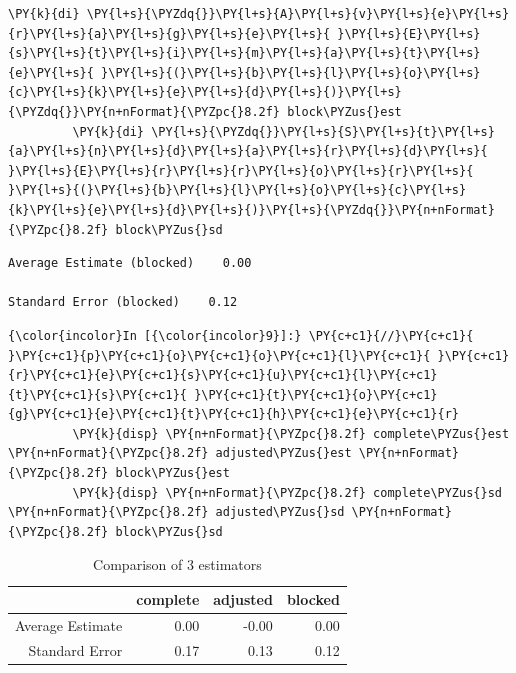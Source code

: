\documentclass[11pt,notitlepage]{article}\usepackage[]{graphicx}\usepackage[]{color}
\makeatletter
\newenvironment{kframe}{%
 \def\at@end@of@kframe{}%
 \ifinner\ifhmode%
  \def\at@end@of@kframe{\end{minipage}}%
  \begin{minipage}{\columnwidth}%
 \fi\fi%
 \def\FrameCommand##1{\hskip\@totalleftmargin \hskip-\fboxsep
 \colorbox{shadecolor}{##1}\hskip-\fboxsep
     \hskip-\linewidth \hskip-\@totalleftmargin \hskip\columnwidth}%
 \MakeFramed {\advance\hsize-\width
   \@totalleftmargin\z@ \linewidth\hsize
   \@setminipage}}%
 {\par\unskip\endMakeFramed%
 \at@end@of@kframe}
\newenvironment{knitrout}{}{} %
\makeatother
\begin{document}
\begin{enumerate}[a)]
\begin{knitrout}
\begin{kframe}
\begin{Verbatim}[commandchars=\\\{\}]
         \PY{k}{di} \PY{l+s}{\PYZdq{}}\PY{l+s}{A}\PY{l+s}{v}\PY{l+s}{e}\PY{l+s}{r}\PY{l+s}{a}\PY{l+s}{g}\PY{l+s}{e}\PY{l+s}{ }\PY{l+s}{E}\PY{l+s}{s}\PY{l+s}{t}\PY{l+s}{i}\PY{l+s}{m}\PY{l+s}{a}\PY{l+s}{t}\PY{l+s}{e}\PY{l+s}{ }\PY{l+s}{(}\PY{l+s}{b}\PY{l+s}{l}\PY{l+s}{o}\PY{l+s}{c}\PY{l+s}{k}\PY{l+s}{e}\PY{l+s}{d}\PY{l+s}{)}\PY{l+s}{\PYZdq{}}\PY{n+nFormat}{\PYZpc{}8.2f} block\PYZus{}est
         \PY{k}{di} \PY{l+s}{\PYZdq{}}\PY{l+s}{S}\PY{l+s}{t}\PY{l+s}{a}\PY{l+s}{n}\PY{l+s}{d}\PY{l+s}{a}\PY{l+s}{r}\PY{l+s}{d}\PY{l+s}{ }\PY{l+s}{E}\PY{l+s}{r}\PY{l+s}{r}\PY{l+s}{o}\PY{l+s}{r}\PY{l+s}{ }\PY{l+s}{(}\PY{l+s}{b}\PY{l+s}{l}\PY{l+s}{o}\PY{l+s}{c}\PY{l+s}{k}\PY{l+s}{e}\PY{l+s}{d}\PY{l+s}{)}\PY{l+s}{\PYZdq{}}\PY{n+nFormat}{\PYZpc{}8.2f} block\PYZus{}sd
\end{Verbatim}

    \begin{Verbatim}[commandchars=\\\{\}]
Average Estimate (blocked)    0.00

Standard Error (blocked)    0.12

    \end{Verbatim}

    \begin{Verbatim}[commandchars=\\\{\}]
{\color{incolor}In [{\color{incolor}9}]:} \PY{c+c1}{//}\PY{c+c1}{ }\PY{c+c1}{p}\PY{c+c1}{o}\PY{c+c1}{o}\PY{c+c1}{l}\PY{c+c1}{ }\PY{c+c1}{r}\PY{c+c1}{e}\PY{c+c1}{s}\PY{c+c1}{u}\PY{c+c1}{l}\PY{c+c1}{t}\PY{c+c1}{s}\PY{c+c1}{ }\PY{c+c1}{t}\PY{c+c1}{o}\PY{c+c1}{g}\PY{c+c1}{e}\PY{c+c1}{t}\PY{c+c1}{h}\PY{c+c1}{e}\PY{c+c1}{r}
         \PY{k}{disp} \PY{n+nFormat}{\PYZpc{}8.2f} complete\PYZus{}est \PY{n+nFormat}{\PYZpc{}8.2f} adjusted\PYZus{}est \PY{n+nFormat}{\PYZpc{}8.2f} block\PYZus{}est
         \PY{k}{disp} \PY{n+nFormat}{\PYZpc{}8.2f} complete\PYZus{}sd \PY{n+nFormat}{\PYZpc{}8.2f} adjusted\PYZus{}sd \PY{n+nFormat}{\PYZpc{}8.2f} block\PYZus{}sd
\end{Verbatim}
\end{kframe}
\end{knitrout}


\begin{table}[H]
\centering
\caption{Comparison of 3 estimators} 
\begin{tabular}{rrrr}
  \hline
 & complete & adjusted & blocked \\ 
  \hline
Average Estimate & 0.00 & -0.00 & 0.00 \\ 
  Standard Error & 0.17 & 0.13 & 0.12 \\ 
   \hline
\end{tabular}
\end{table}



\end{enumerate}
\end{document}
